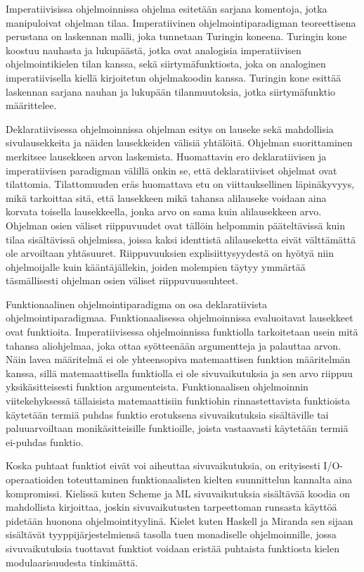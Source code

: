 Imperatiivisissa ohjelmoinnissa ohjelma esitetään sarjana komentoja, jotka manipuloivat ohjelman tilaa. Imperatiivinen ohjelmointiparadigman teoreettisena perustana on laskennan malli, joka tunnetaan Turingin koneena. Turingin kone koostuu nauhasta ja lukupäästä, jotka ovat analogisia imperatiivisen ohjelmointikielen tilan kanssa, sekä siirtymäfunktiosta, joka on analoginen imperatiivisella kiellä kirjoitetun ohjelmakoodin kanssa. Turingin kone esittää laskennan sarjana nauhan ja lukupään tilanmuutoksia, jotka siirtymäfunktio määrittelee. 
\par
Deklaratiivisessa ohjelmoinnissa ohjelman esitys on lauseke sekä mahdollisia sivulausekkeita ja näiden lausekkeiden välisiä yhtälöitä. Ohjelman suorittaminen merkitsee lausekkeen arvon laskemista. Huomattavin ero deklaratiivisen ja imperatiivisen paradigman välillä onkin se, että deklaratiiviset ohjelmat ovat tilattomia. Tilattomuuden eräs huomattava etu on viittauksellinen läpinäkyvyys, mikä tarkoittaa sitä, että lausekkeen mikä tahansa alilauseke voidaan aina korvata toisella lausekkeella, jonka arvo on sama kuin alilausekkeen arvo. Ohjelman osien väliset riippuvuudet ovat tällöin helpommin pääteltävissä kuin tilaa sisältävissä ohjelmissa, joissa kaksi identtistä alilauseketta eivät välttämättä ole arvoiltaan yhtäsuuret. Riippuvuuksien explisiittysyydestä on hyötyä niin ohjelmoijalle kuin kääntäjällekin, joiden molempien täytyy ymmärtää täsmällisesti ohjelman osien väliset riippuvuussuhteet. 
\par
Funktionaalinen ohjelmointiparadigma on osa deklaratiivista ohjelmointiparadigmaa. Funktionaalisessa ohjelmoinnissa evaluoitavat lausekkeet ovat funktioita. Imperatiivisessa ohjelmoinnissa funktiolla tarkoitetaan usein mitä tahansa aliohjelmaa, joka ottaa syötteenään argumentteja ja palauttaa arvon. Näin lavea määritelmä ei ole yhteensopiva matemaattisen funktion määritelmän kanssa, sillä matemaattisella funktiolla ei ole sivuvaikutuksia ja sen arvo riippuu yksikäsitteisesti funktion argumenteista. Funktionaalisen ohjelmoinnin viitekehyksessä tällaisista matemaattisiin funktiohin rinnastettavista funktioista käytetään termiä puhdas funktio erotuksena sivuvaikutuksia sisältäville tai paluuarvoiltaan monikäsitteisille funktioille, joista vastaavasti käytetään termiä ei-puhdas funktio.  
\par
Koska puhtaat funktiot eivät voi aiheuttaa sivuvaikutuksia, on erityisesti I/O-operaatioiden toteuttaminen funktionaalisten kielten suunnittelun kannalta aina kompromissi. Kielissä kuten Scheme ja ML sivuvaikutuksia sisältävää koodia on mahdollista kirjoittaa, joskin sivuvaikutusten tarpeettoman runsasta käyttöä pidetään huonona ohjelmointityylinä. Kielet kuten Haskell ja Miranda sen sijaan sisältävät tyyppijärjestelmiensä tasolla tuen monadiselle ohjelmoinnille, jossa sivuvaikutuksia tuottavat funktiot voidaan eristää puhtaista funktiosta kielen modulaarisuudesta tinkimättä.       
